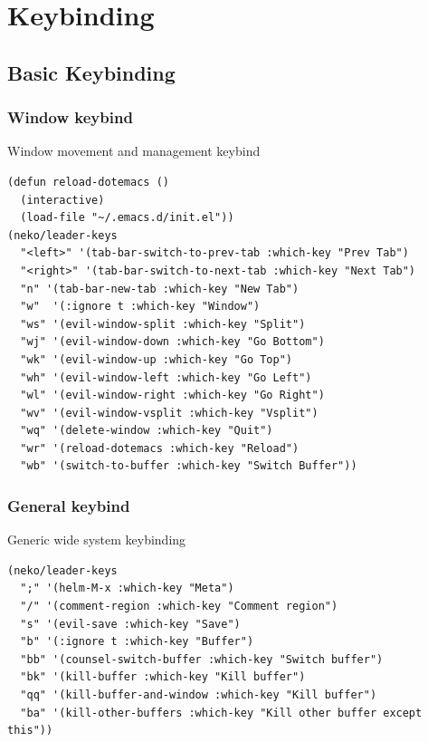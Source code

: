 \documentclass[11pt]{article}
\begin{document}
\section{Keybinding}
\label{sec:orgc5b14b9}

\subsection{Basic Keybinding}
\label{sec:orgca81897}

\subsubsection{Window keybind}
\label{sec:org343a4dc}

Window movement and management keybind

\begin{verbatim}
(defun reload-dotemacs ()
  (interactive)
  (load-file "~/.emacs.d/init.el"))
(neko/leader-keys
  "<left>" '(tab-bar-switch-to-prev-tab :which-key "Prev Tab")
  "<right>" '(tab-bar-switch-to-next-tab :which-key "Next Tab")
  "n" '(tab-bar-new-tab :which-key "New Tab")
  "w"  '(:ignore t :which-key "Window")
  "ws" '(evil-window-split :which-key "Split")
  "wj" '(evil-window-down :which-key "Go Bottom")
  "wk" '(evil-window-up :which-key "Go Top")
  "wh" '(evil-window-left :which-key "Go Left")
  "wl" '(evil-window-right :which-key "Go Right")
  "wv" '(evil-window-vsplit :which-key "Vsplit")
  "wq" '(delete-window :which-key "Quit")
  "wr" '(reload-dotemacs :which-key "Reload")
  "wb" '(switch-to-buffer :which-key "Switch Buffer")) 

\end{verbatim}

\subsubsection{General keybind}
\label{sec:org60c61c7}

Generic wide system keybinding

\begin{verbatim}
(neko/leader-keys
  ";" '(helm-M-x :which-key "Meta")
  "/" '(comment-region :which-key "Comment region")
  "s" '(evil-save :which-key "Save")
  "b" '(:ignore t :which-key "Buffer")
  "bb" '(counsel-switch-buffer :which-key "Switch buffer")
  "bk" '(kill-buffer :which-key "Kill buffer")
  "qq" '(kill-buffer-and-window :which-key "Kill buffer")
  "ba" '(kill-other-buffers :which-key "Kill other buffer except this"))
\end{verbatim}
\end{document}
